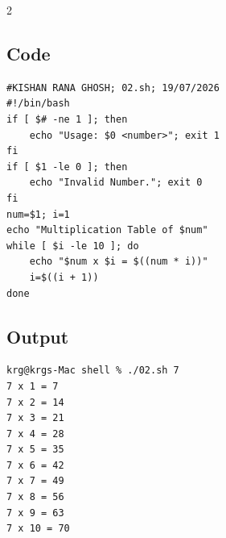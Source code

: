 \documentclass[a4paper,12pt]{article}
\begin{document}
\begin{multicols}{2}
\subsection*{Code}
\begin{lstlisting}[style=bashstyle]
#KISHAN RANA GHOSH; 02.sh; 19/07/2026
#!/bin/bash
if [ $# -ne 1 ]; then
    echo "Usage: $0 <number>"; exit 1
fi
if [ $1 -le 0 ]; then 
    echo "Invalid Number."; exit 0
fi  
num=$1; i=1
echo "Multiplication Table of $num"
while [ $i -le 10 ]; do
    echo "$num x $i = $((num * i))"
    i=$((i + 1))
done
\end{lstlisting}

\subsection*{Output}
\begin{lstlisting}[style=outputstyle]
krg@krgs-Mac shell % ./02.sh 7
7 x 1 = 7
7 x 2 = 14
7 x 3 = 21
7 x 4 = 28
7 x 5 = 35
7 x 6 = 42
7 x 7 = 49
7 x 8 = 56
7 x 9 = 63
7 x 10 = 70
\end{lstlisting}

\end{multicols}
\newpage
\end{document}
